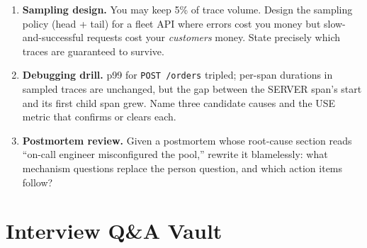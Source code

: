 \begin{enumerate}
        latency across instances: 210\,ms.'' List two distinct ways this
        number can understate user pain, and give the correct aggregation.
  \item \textbf{Sampling design.} You may keep 5\% of trace volume.
        Design the sampling policy (head + tail) for a fleet API where
        errors cost you money but slow-and-successful requests cost your
        \emph{customers} money. State precisely which traces are guaranteed
        to survive.
  \item \textbf{Debugging drill.} p99 for \texttt{POST /orders} tripled;
        per-span durations in sampled traces are unchanged, but the gap
        between the SERVER span's start and its first child span grew.
        Name three candidate causes and the USE metric that confirms or
        clears each.
  \item \textbf{Postmortem review.} Given a postmortem whose root-cause
        section reads ``on-call engineer misconfigured the pool,'' rewrite
        it blamelessly: what mechanism questions replace the person
        question, and which action items follow?
\end{enumerate}
\section{Interview Q\&A Vault}
\label{sec:ch18-interview}

